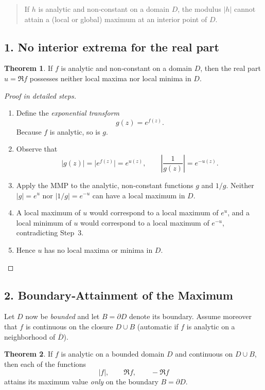 \documentclass[12pt]{article}
\theoremstyle{definition} %
\newtheorem{theorem}{Theorem}
\theoremstyle{plain} %
\begin{document}
\begin{quote}
If $h$ is analytic and non‑constant on a domain $D$, the modulus $|h|$ cannot attain a (local or global) maximum at an interior point of $D$.
\end{quote}

\subsection*{1.  No interior extrema for the real part}

\begin{theorem}\label{thm:NoInteriorExtrema}
If $f$ is analytic and non‑constant on a domain $D$, then the real part $u=\Re f$ possesses neither local maxima nor local minima in $D$.
\end{theorem}

\begin{proof}[Proof in detailed steps]
\begin{enumerate}
  \item Define the \emph{exponential transform}  
        \[
        g(z)=e^{f(z)}.
        \]
        Because $f$ is analytic, so is $g$.
  \item Observe that  
        \[
        |g(z)|=\bigl|e^{f(z)}\bigr| = e^{u(z)},\qquad 
        \left| \frac{1}{g(z)} \right| = e^{-u(z)} .
        \]
  \item Apply the MMP to the analytic, non‑constant functions $g$ and $1/g$.  
        Neither $|g|=e^{u}$ nor $|1/g| = e^{-u}$ can have a local maximum in $D$.
  \item A local maximum of $u$ would correspond to a local maximum of $e^{u}$, and a
        local minimum of $u$ would correspond to a local maximum of $e^{-u}$, contradicting Step~3.
  \item Hence $u$ has no local maxima or minima in $D$.
\end{enumerate}
\end{proof}

\subsection*{2.  Boundary‐Attainment of the Maximum}

Let $D$ now be \emph{bounded} and let $B=\partial D$ denote its boundary.  
Assume moreover that $f$ is continuous on the closure $D\cup B$ (automatic if $f$ is analytic on a neighborhood of $\overline{D}$).

\begin{theorem}\label{thm:BoundaryMaximum}
If $f$ is analytic on a bounded domain $D$ and continuous on $D\cup B$, then each of the functions
\[
|f|,\qquad \Re f,\qquad -\Re f
\]
attains its maximum value \emph{only} on the boundary $B=\partial D$.
\end{theorem}
\end{document}
